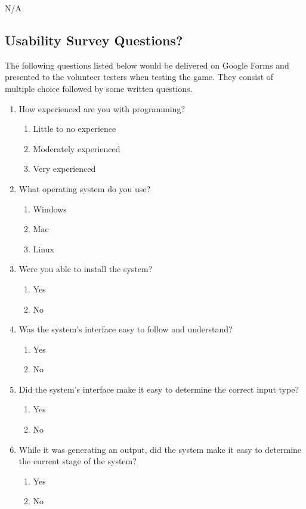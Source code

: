 \documentclass[12pt, titlepage]{article}
\begin{document}
N/A

\subsection{Usability Survey Questions?}
The following questions listed below would be delivered on Google Forms and presented to the volunteer testers when testing the game. They consist of multiple choice followed by some written questions.
\begin{enumerate}

\item How experienced are you with programming?
   \begin{enumerate}
     \item Little to no experience
     \item Moderately experienced
     \item Very experienced
   \end{enumerate}

\item What operating system do you use?
   \begin{enumerate}
     \item Windows
     \item Mac
     \item Linux
   \end{enumerate}

\item Were you able to install the system?
   \begin{enumerate}
     \item Yes
     \item No
   \end{enumerate}
   
\item Was the system's interface easy to follow and understand?
   \begin{enumerate}
     \item Yes
     \item No
   \end{enumerate}

\item Did the system's interface make it easy to determine the correct input type?
   \begin{enumerate}
     \item Yes
     \item No
   \end{enumerate}

\item While it was generating an output, did the system make it easy to determine the current stage of the system?
   \begin{enumerate}
     \item Yes
     \item No
   \end{enumerate}


\end{enumerate}
\end{document}
